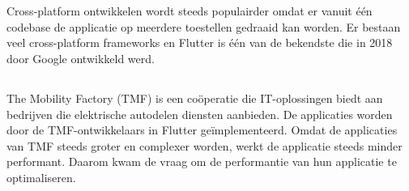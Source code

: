 
\chapter{}%
\label{ch:inleiding}
Cross-platform ontwikkelen wordt steeds populairder omdat er vanuit één codebase de applicatie op meerdere toestellen gedraaid kan worden. Er bestaan veel cross-platform frameworks en Flutter is één van de bekendste die in 2018 door Google ontwikkeld werd. 





\section{}%
\label{sec:probleemstelling}
The Mobility Factory (TMF) is een coöperatie die IT-oplossingen biedt aan bedrijven die elektrische autodelen diensten aanbieden. De applicaties worden door de TMF-ontwikkelaars in Flutter geïmplementeerd. Omdat de applicaties van TMF steeds groter en complexer worden, werkt de applicatie steeds minder performant. Daarom kwam de vraag om de performantie van hun applicatie te optimaliseren. 

